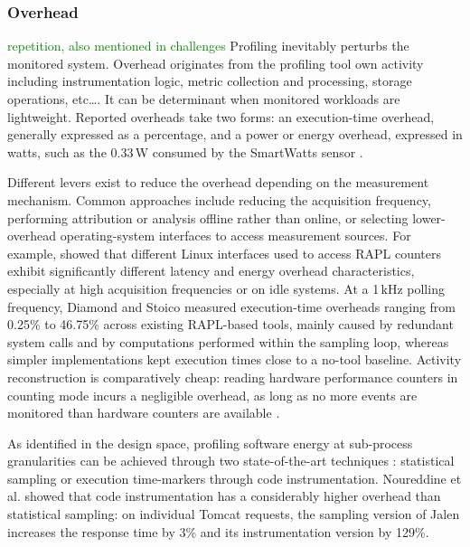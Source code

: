 \documentclass[
  acmsmall,
  screen,
  review,
  xcolor={dvipsnames,usenames}
]{acmart}
\newcommand{\iness}[1]{\textcolor{green}{#1}}
\begin{document}
\subsubsection{\textbf{Overhead}} \label{sec:overhead}
\iness{repetition, also mentioned in challenges}
Profiling inevitably perturbs the monitored system. Overhead originates from the profiling tool own activity including instrumentation logic, metric collection and processing, storage operations, etc\dots. It can be determinant when monitored workloads are lightweight. Reported overheads take two forms: an execution-time overhead, generally expressed as a percentage, and a power or energy overhead, expressed in watts, such as the 0.33\,W consumed by the SmartWatts sensor \cite{fieniSmartWattsSelfCalibratingSoftwareDefined2020}.

Different levers exist to reduce the overhead depending on the measurement mechanism. Common approaches include reducing the acquisition frequency, performing attribution or analysis offline rather than online, or selecting lower-overhead operating-system interfaces to access measurement sources. For example, \cite{raffinDissectingSoftwarebasedMeasurement2025} showed that different Linux interfaces used to access RAPL counters exhibit significantly different latency and energy overhead characteristics, especially at high acquisition frequencies or on idle systems. At a 1\,kHz polling frequency, Diamond and Stoico \cite{diamondWhatCostEnergy2026} measured execution-time overheads ranging from 0.25\% to 46.75\% across existing RAPL-based tools, mainly caused by redundant system calls and by computations performed within the sampling loop, whereas simpler implementations kept execution times close to a no-tool baseline. Activity reconstruction is comparatively cheap: reading hardware performance counters in counting mode incurs a negligible overhead, as long as no more events are monitored than hardware counters are available \cite{nowakOverheadProfilingUsing2014}.

As identified in the design space, profiling software energy at sub-process granularities can be achieved through two state-of-the-art techniques : statistical sampling or execution time-markers through code instrumentation. Noureddine et al. \cite{noureddineMonitoringEnergyHotspots2015} showed that code instrumentation has a considerably higher overhead than statistical sampling: on individual Tomcat requests, the sampling version of Jalen increases the response time by 3\% and its instrumentation version by 129\%.
\end{document}
